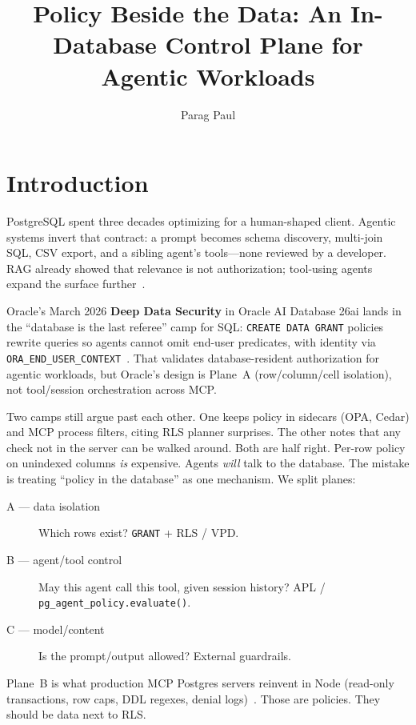 \documentclass[sigconf,review]{acmart}
\title{Policy Beside the Data: An In-Database Control Plane for Agentic Workloads}
\author{Parag Paul}
\affiliation{%
  \institution{Agentic Memory Foundation}
  \city{San Francisco}
  \country{USA}
}
\begin{document}
\maketitle

\section{Introduction}

PostgreSQL spent three decades optimizing for a human-shaped client. Agentic systems invert that contract: a prompt becomes schema discovery, multi-join SQL, CSV export, and a sibling agent's tools---none reviewed by a developer. RAG already showed that relevance is not authorization; tool-using agents expand the surface further~\cite{securing-the-agent-2026,aws-agent-mesh}.

Oracle's March 2026 \textbf{Deep Data Security} in Oracle AI Database 26ai lands in the ``database is the last referee'' camp for SQL: \texttt{CREATE DATA GRANT} policies rewrite queries so agents cannot omit end-user predicates, with identity via \texttt{ORA\_END\_USER\_CONTEXT}~\cite{oracle-dds-blog,oracle-dds-docs}. That validates database-resident authorization for agentic workloads, but Oracle's design is Plane~A (row/column/cell isolation), not tool/session orchestration across MCP.

Two camps still argue past each other. One keeps policy in sidecars (OPA, Cedar) and MCP process filters, citing RLS planner surprises. The other notes that any check not in the server can be walked around. Both are half right. Per-row policy on unindexed columns \emph{is} expensive. Agents \emph{will} talk to the database. The mistake is treating ``policy in the database'' as one mechanism. We split planes:

\begin{description}
\item[A --- data isolation] Which rows exist? \texttt{GRANT} + RLS / VPD.
\item[B --- agent/tool control] May this agent call this tool, given session history? APL / \texttt{pg\_agent\_policy.evaluate()}.
\item[C --- model/content] Is the prompt/output allowed? External guardrails.
\end{description}

Plane~B is what production MCP Postgres servers reinvent in Node (read-only transactions, row caps, DDL regexes, denial logs)~\cite{safe-postgres-mcp,pgguard-mcp,postgres-mcp-pro}. Those are policies. They should be data next to RLS.
\end{document}
